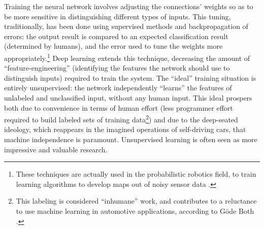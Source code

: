 
Training the
neural network involves adjusting the connections' weights so as to
be more sensitive in distinguishing different types of
inputs. This tuning,
traditionally, has been done using supervised methods and
backpropagation of errors: the output result is compared to an
expected classification result (determined by humans), and the error used to tune the weights
more appropriately.\footnote{These techniques are actually used in the
probabilistic robotics field, to train learning algorithms to develop
maps out of noisy sensor data \cite[p. 284-297]{thrunProb}.} Deep
learning extends this technique, decreasing 
the amount of ``feature-engineering'' (identifying the
features the network should use to distinguish inputs) required to
train the system. The ``ideal'' training situation is entirely
unsupervised: the network independently ``learns'' the features of
unlabeled and unclassified input, without any human input. This ideal
prospers both due to convenience in terms of human effort (less
programmer effort required to build labeled sets of training
data\footnote{This labeling is considered ``inhumane'' work, and contributes to
a reluctance to use machine learning in automotive applications,
according to G\"{o}de Both \cite{bothpt2}.}) and
due to the deep-seated ideology, which reappears in the imagined
operations of self-driving cars, that machine independence is
paramount. Unsupervised learning is often seen as more impressive and
valuable research.




